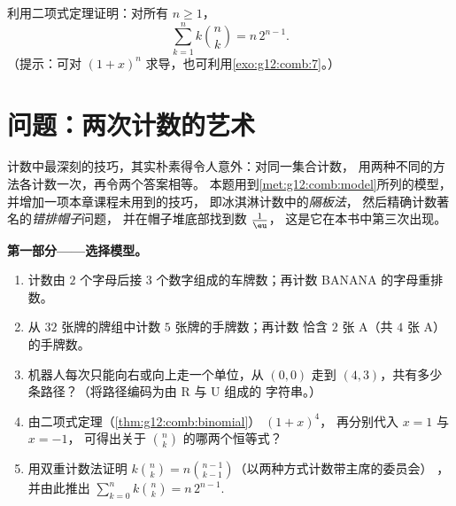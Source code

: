 \begin{exercise}[$\star\star\star$]\label{exo:g12:comb:10}
利用二项式定理证明：对所有 $n \geq 1$，
\[
\sum_{k=1}^{n} k \binom{n}{k} = n\,2^{n-1}.
\]
（提示：可对 $(1+x)^n$ 求导，也可利用\cref{exo:g12:comb:7}。）
\end{exercise}

\section{问题：两次计数的艺术}

\begin{problem}
\label{pb:g12:comb:1}
计数中最深刻的技巧，其实朴素得令人意外：对同一集合计数，
用两种不同的方法各计数一次，再令两个答案相等。
本题用到\cref{met:g12:comb:model}所列的模型，
并增加一项本章课程未用到的技巧，
即冰淇淋计数中的\emph{隔板法}，
然后精确计数著名的\emph{错排帽子}问题，
并在帽子堆底部找到数 $\frac1\eu$，
这是它在本书中第三次出现。

\medskip
\noindent\textbf{第一部分——选择模型。}
\begin{enumerate}
  \item 计数由 $2$ 个字母后接
        $3$ 个数字组成的车牌数；再计数 BANANA 的字母重排数。
  \item 从 $32$ 张牌的牌组中计数 $5$ 张牌的手牌数；再计数
        恰含 $2$ 张 A（共 $4$ 张 A）的手牌数。
  \item 机器人每次只能向右或向上走一个单位，从 $(0,0)$ 走到
        $(4,3)$，共有多少条路径？（将路径编码为由 R 与 U 组成的
        字符串。）
  \item 由二项式定理（\cref{thm:g12:comb:binomial}） $(1 + x)^4$，
        再分别代入 $x = 1$ 与 $x = -1$，
        可得出关于
        $\binom nk$ 的哪两个恒等式？
  \item 用双重计数法证明
        $k\binom nk = n\binom{n-1}{k-1}$（以两种方式计数带主席的委员会）
        ，并由此推出
        $\sum_{k=0}^{n} k\binom nk = n\,2^{n-1}$.
\end{enumerate}


\end{problem}
